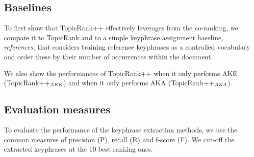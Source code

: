   \subsection{Baselines}
  \label{subsec:baselines}
    To first show that TopicRank++ effectively leverages from the co-ranking, we
    compare it to TopicRank and to a simple keyphrase assignment baseline,
    \textit{references}, that considers training reference keyphrases as a
    controlled vocabulary and order these by their number of occurrences within
    the document.

    We also show the performances of TopicRank++ when it only performs AKE
    (TopicRank++$_\textnormal{\textit{AKE}}$) and when it only performs AKA
    (TopicRank++$_\textnormal{\textit{AKA}}$).
  \subsection{Evaluation measures}
  \label{subsec:evaluation_measures}
    To evaluate the performance of the keyphrase extraction methods, we use the
    common measures of precision (P), recall (R) and f-score (F). We cut-off the
    extracted keyphrases at the 10 best ranking ones.

